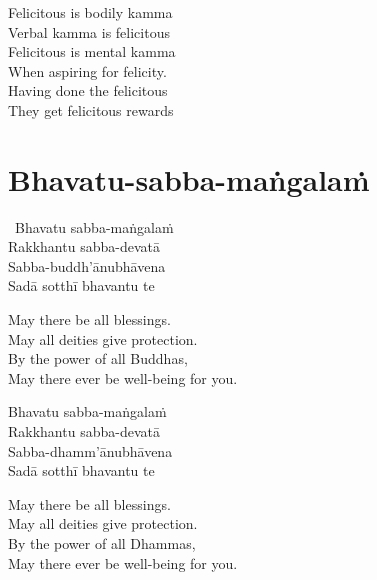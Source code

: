 \begin{english-verses}
  Felicitous is bodily kamma\\
  Verbal kamma is felicitous\\
  Felicitous is mental kamma\\
  When aspiring for felicity.\\
  Having done the felicitous\\
  They get felicitous rewards
\end{english-verses}

\suttaRef{[AN 3.155]}

\section{Bhavatu-sabba-maṅgalaṁ}
\label{bhavatu-sabba-mangalam'protective}

\begin{pali-hangtogether}
  \anglebracketleft\ \hspace{-0.5mm}Bhavatu sabba-maṅgalaṁ \hspace{-0.5mm}\anglebracketright\ \\
  Rakkhantu sabba-devatā\\
  Sabba-buddh'ānubhāvena\\
  Sadā sotthī bhavantu te
\end{pali-hangtogether}

\begin{english-verses}
  May there be all blessings.\\
  May all deities give protection.\\
  By the power of all Buddhas,\\
  May there ever be well-being for you.
\end{english-verses}

\begin{pali-hang-continued}
  Bhavatu sabba-maṅgalaṁ\\
  Rakkhantu sabba-devatā\\
  Sabba-dhamm'ānubhāvena\\
  Sadā sotthī bhavantu te
\end{pali-hang-continued}

\begin{english-verses}
  May there be all blessings.\\
  May all deities give protection.\\
  By the power of all Dhammas,\\
  May there ever be well-being for you.
\end{english-verses}

